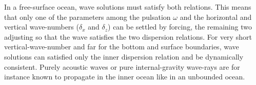 \documentclass[a4paper,11pt]{article}
\begin{document}
In a free-surface ocean, wave solutions must satisfy both relations. This means that only one of the parameters among the pulsation $\omega$ and the horizontal and vertical wave-numbers ($\delta_x$ and $\delta_z$) can be settled by forcing, the remaining two adjusting so that the wave satisfies the two dispersion relations. For very short vertical-wave-number and far for the bottom and surface boundaries, wave solutions can satisfied only the inner dispersion relation and be dynamically consistent. Purely acoustic waves or pure internal-gravity wave-rays are for instance known to propagate in the inner ocean like in an unbounded ocean.\\

\end{document}
